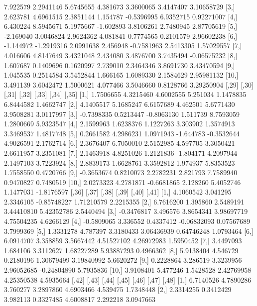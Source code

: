 \documentclass[12pt]{article}
\begin{document}
\begin{Schunk}
\begin{Soutput}
 [2,]  7.922579  2.2941146 5.6745655  4.381673  3.3600065 3.4147407  3.10658729
 [3,]  2.623781  4.6961515 2.3851144  1.154787 -0.5396995 6.9352715  0.92271007
 [4,]  6.430224  8.5945671 5.1975667 -1.602893  3.8106261 2.7480945  2.87705619
 [5,] -2.169040  3.0046824 2.9624362  4.081841  0.7774565 0.2101579  2.96602238
 [6,] -1.144972 -1.2919316 2.0991638  2.456948 -0.7581963 2.5413305  1.57029557
 [7,]  4.016606  4.8147649 3.4321048  2.434080  3.4876700 3.7435494 -0.06575232
 [8,]  1.607687  0.1409696 0.1620997  2.739010  2.3464346 3.8691730  3.43470594
 [9,]  1.045535  0.2514584 3.5452844  1.666165  1.6089330 2.1584629  2.95981132
[10,]  3.491139  3.6042472 1.5000621  4.077466  3.5046660 0.8128766  3.29250904
           [,29]     [,30]      [,31]     [,32]      [,33]     [,34]      [,35]
 [1,]  1.7506655 4.3215460  4.6002555  5.251034  1.1478835 6.8444582  1.4662747
 [2,]  4.1405517 5.1685247  6.6157689  4.462501  5.6771430 3.9508281  3.0117997
 [3,] -0.7398335 0.5213447 -0.8063130  1.511739  8.7593059 1.2800669  5.9323547
 [4,]  2.1599963 1.6238376  1.1227263  3.303902  1.3574913 3.3469537  1.4817748
 [5,]  0.2661582 4.2986231  1.0971943 -1.644783 -0.3532644 4.9026591  2.1762714
 [6,]  2.3676407 6.7050010  2.5152985  4.597705  3.3050421 2.6611957  3.2351081
 [7,]  2.1463918 4.8251026  1.2121836 -1.804171  4.2097944 2.1497103  3.7223924
 [8,]  2.8839173 1.6628761  3.3592812  1.974937  5.8353523 1.7558550  0.4720766
 [9,] -0.3653674 0.8210073  2.2782231  2.821793  7.7589940 0.9470827  0.7480519
[10,]  2.0273323 4.2781871 -0.6681865  2.128260  5.4052746 1.1477031 -1.8176597
           [,36]    [,37]     [,38]       [,39]       [,40]     [,41]
 [1,]  4.1060542 3.041295 2.3346105 -0.85748227  1.71210579 2.2215355
 [2,]  6.7616200 1.395860 2.5489191  3.44410810  5.42352786 2.5440494
 [3,] -0.3476817 3.496576 3.8654341  3.98697719  4.75504235 4.6266129
 [4,] -0.5809065 3.336552 0.4337412 -0.06832093  0.07567689 3.7999369
 [5,]  1.3331278 4.787397 3.3180433  3.06436939  0.64746248 1.0793464
 [6,]  6.0914707 3.358859 3.5667442  4.51527102  4.26972983 1.5950452
 [7,]  3.4497093 1.684106 3.3112627  1.68227289  5.93887293 0.4966362
 [8,]  5.9138404 4.546729 0.2180196  1.30679499  3.19840992 5.6620272
 [9,]  0.2228864 3.286519 3.3239956  2.96052685 -0.24804890 5.7935836
[10,]  3.9108401 5.477246 1.5428528  2.42769958  4.25350538 4.5935664
           [,42]     [,43]     [,44]      [,45]      [,46]    [,47]      [,48]
 [1,]  6.7140526 4.7890286  3.760277  3.2897860  4.6903466 4.539475  1.7348448
 [2,]  2.3314255 0.3412429  3.982113  0.3327485  4.6008817 2.292218  3.0947663

\end{Soutput}
\end{Schunk}
\end{document}
